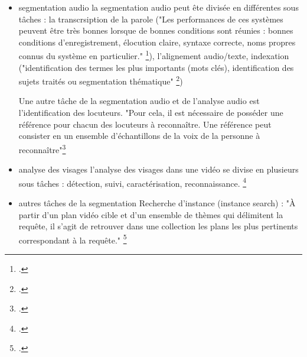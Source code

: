 \begin{itemize}
limites des CNN : "CNNs cannot adequately learn cues which are temporally distributed along the video due to difficulties to model temporal features data dependencies."\footcite{trojahn2021}

RNNs : "Successfully employed on text processing, RNNs are fitted to analyze sequences of data of variable length and may better grasp the temporal relationship among low-level features of video segments, hopefully obtaining more accurate scene boundary detection."\footcite{trojahn2021}. Les RNN permettent de mieux capturer les relations temporelles. 

Une des solutions serait de combiner CNN et RNN : complémentaires. 

\subitem DIVAN - INA
mise en place d'un système expérimental d'indexation semi automatique des archives audiovisuelles, conçu en trois étapes : segmenter, classifier, composer. \footcite{zotero-item-644}. les évènements détectés dans l'image sont annotés et validés par les archivistes.

\item segmentation audio 
la segmentation audio peut ête divisée en différentes sous tâches : 
la transcrsiption de la parole ("Les performances de ces systèmes peuvent être très bonnes lorsque de bonnes conditions sont réunies : bonnes conditions d’enregistrement, élocution claire, syntaxe correcte, noms propres connus du système en particulier." \footcite{carrive2014}), l'alignement audio/texte, indexation ("identification des termes les plus importants (mots clés), identification des sujets traités ou segmentation thématique" \footcite{carrive2014})

Une autre tâche de la segmentation audio et de l'analyse audio est l'identification des locuteurs. "Pour cela, il est nécessaire de posséder une référence pour chacun des locuteurs à reconnaître. Une référence peut consister en un ensemble d’échantillons de la voix de la personne à reconnaître"\footcite{carrive2014}

\item analyse des visages 
l'analyse des visages dans une vidéo se divise en plusieurs sous tâches : détection, suivi, caractérisation, reconnaissance. \footcite{carrive2014}

\item autres tâches de la segmentation 
Recherche d'instance (instance search) : "À partir d’un plan vidéo cible et d’un ensemble de thèmes qui délimitent la requête, il s’agit de retrouver dans une collection les plans les plus pertinents correspondant à la requête." \footcite{carrive2014}


\end{itemize}
